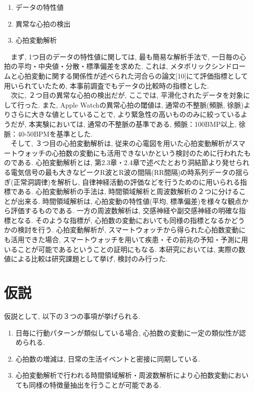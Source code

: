 \documentclass[report, 11pt, a4paper]{jsbook}
\begin{document}
\begin{enumerate}
  \item データの特性値
  \item 異常な心拍の検出
  \item 心拍変動解析
\end{enumerate}

　まず, 1つ目のデータの特性値に関しては, 最も簡易な解析手法で, 一日毎の心拍の平均・中央値・分散・標準偏差を求めた. これは, メタボリックシンドロームと心拍変動に関する関係性が述べられた河合らの論文[10]にて評価指標として用いられていたため, 本事前調査でもデータの比較時の指標とした. \\
　次に, ２つ目の異常な心拍の検出だが, ここでは, 平滑化されたデータを対象にして行った. また, Apple Watchの異常心拍の閾値は, 通常の不整脈(頻脈, 徐脈)よりさらに大きな値としていることで, より緊急性の高いもののみに絞っているようだが, 本実験においては, 通常の不整脈の基準である, 頻脈：100BMP以上, 徐脈：40-50BPMを基準とした. \\
　そして, ３つ目の心拍変動解析は, 従来の心電図を用いた心拍変動解析がスマートウォッチの心拍数の変動にも活用できないかという検討のために行われたものである. 心拍変動解析とは, 第2.3章・2.4章で述べたとおり洞結節より発せられる電気信号の最も大きなピークR波とR波の間隔(RR間隔)の時系列データの揺らぎ(正常洞調律)を解析し, 自律神経活動の評価などを行うためのに用いられる指標である. 心拍変動解析の手法は, 時間領域解析と周波数解析の２つに分けることが出来る. 時間領域解析は, 心拍変動の特性値(平均, 標準偏差)を様々な観点から評価するものである. 一方の周波数解析は, 交感神経や副交感神経の明確な指標となる. そのような指標が, 心拍数の変動においても同様の指標となるかどうかの検討を行う.  心拍変動解析が, スマートウォッチから得られた心拍数変動にも活用できた場合, スマートウォッチを用いて疾患・その前兆の予知・予測に用いることが可能であるということの証明にもなる. 本研究においては, 実際の数値による比較は研究課題として挙げ, 検討のみ行った. 

\section{仮説}

仮説として, 以下の３つの事項が挙げられる. 

\begin{enumerate}
  \item 日毎に行動パターンが類似している場合, 心拍数の変動に一定の類似性が認められる.
  \item 心拍数の増減は, 日常の生活イベントと密接に同期している. 
  \item 心拍変動解析で行われる時間領域解析・周波数解析により心拍数変動においても同様の特徴量抽出を行うことが可能である.
\end{enumerate}
\end{document}
